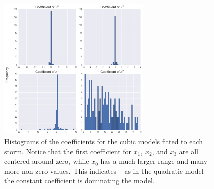 \documentclass{article}
\begin{document}
	\begin{figure}[h]
			\centering
			\includegraphics[width=0.65\textwidth]{images/cubic.png}
		\caption{Histograms of the coefficients for the cubic models fitted to each storm. Notice that the first coefficient for $x_1$, $x_2$, and $x_3$ are all centered around zero, while $x_0$ has a much larger range and many more non-zero values. This indicates -- as in the quadratic model -- the constant coefficient is dominating the model.}
		\label{cubic}
	\end{figure}
	
	
	
\end{document}
